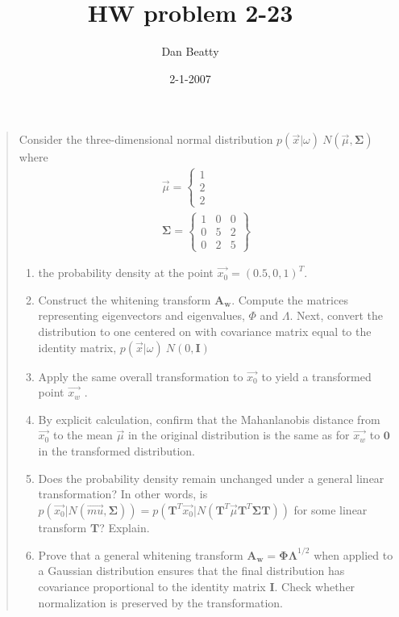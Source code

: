 \documentclass[11pt]{article}
\title{HW problem 2-23}
\author{Dan Beatty}
\date{2-1-2007}                           %
\begin{document}
\maketitle


\begin{quote}
	Consider the three-dimensional normal distribution $p(\vec{x}|\omega) ~ N(\vec{\mu}, \mathbf{\Sigma})$ where 
	\begin{eqnarray}
		\vec{\mu} = 
		\left\{
		\begin{array}{l}
			1 \\
			2 \\
			2 
		\end{array}
		\right.
		\\
		\mathbf{\Sigma} = 
		\left\{
		\begin{array}{lll}
			1 & 0 & 0 \\
			0 & 5 & 2 \\
			0 & 2 & 5 
		\end{array}
		\right\}
	\end{eqnarray}
	\begin{enumerate}
		\item the probability density at the point $\vec{x_0}= (0.5,0,1)^T$.\label{partA}
		\item Construct the whitening transform $\mathbf{A_w}$.  Compute the matrices representing eigenvectors and eigenvalues, $\Phi$ and $\Lambda$.  Next, convert the distribution to one centered on with covariance matrix equal to the identity matrix, $p(\vec{x}|\omega) ~ N(0,\mathbf{I})$
		\item Apply the same overall transformation to $\vec{x_0}$ to yield a transformed point $\vec{x_w}$ .
		\item By explicit calculation, confirm that the Mahanlanobis distance from $\vec{x_0}$ to the mean $\vec{\mu}$ in the original distribution is the same as for $\vec{x_w}$ to $\mathbf{0}$ in the transformed distribution.  
		\item Does the probability density remain unchanged under a general linear transformation?  In other words, is $p(\vec{x_0}|N(\vec{mu} , \mathbf{\Sigma})) = p(\mathbf{T}^T \vec{x_0} | N(\mathbf{T}^T \vec{\mu}\mathbf{T}^T \mathbf{\Sigma T} ))$ for some linear transform $\mathbf{T}$?  Explain.
		\item Prove that a general whitening transform $\mathbf{A_w} = \mathbf{\Phi \Lambda}^{1/2} $ when applied to a Gaussian distribution ensures that the final distribution has covariance proportional to the identity matrix $\mathbf{I}$.  Check whether normalization is preserved by the transformation.  
	\end{enumerate}
	
\end{quote}
\end{document}
